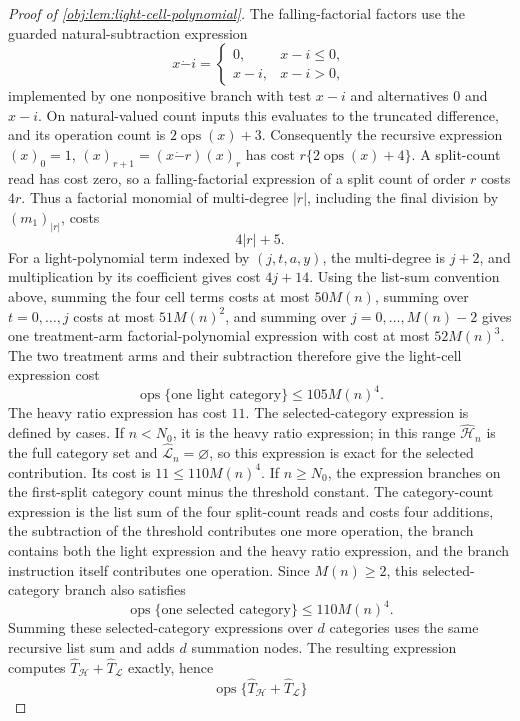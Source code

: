 \begin{proof}[Proof of \cref{obj:lem:light-cell-polynomial}]
The falling-factorial factors use the guarded natural-subtraction expression
\[
x\mathbin{\dot{-}} i
=
\begin{cases}
0,&x-i\le0,\\
x-i,&x-i>0,
\end{cases}
\]
implemented by one nonpositive branch with test \(x-i\) and alternatives \(0\) and \(x-i\).  On natural-valued count inputs this evaluates to the truncated difference, and its operation count is \(2\operatorname{ops}(x)+3\).  Consequently the recursive expression
\((x)_0=1\), \((x)_{r+1}=(x\mathbin{\dot{-}} r)(x)_r\) has cost \(r\{2\operatorname{ops}(x)+4\}\).  A split-count read has cost zero, so a falling-factorial expression of a split count of order \(r\) costs \(4r\).  Thus a factorial monomial of multi-degree \(|r|\), including the final division by \((m_1)_{|r|}\), costs
\[
4|r|+5 .
\]
For a light-polynomial term indexed by \((j,t,a,y)\), the multi-degree is \(j+2\), and multiplication by its coefficient gives cost \(4j+14\).  Using the list-sum convention above, summing the four cell terms costs at most \(50M(n)\), summing over \(t=0,\ldots,j\) costs at most \(51M(n)^2\), and summing over \(j=0,\ldots,M(n)-2\) gives one treatment-arm factorial-polynomial expression with cost at most \(52M(n)^3\).  The two treatment arms and their subtraction therefore give the light-cell expression cost
\[
\operatorname{ops}\{\text{one light category}\}
\le 105M(n)^4 .
\]
The heavy ratio expression has cost \(11\).  The selected-category expression is defined by cases.  If \(n<N_0\), it is the heavy ratio expression; in this range \(\widehat{\mathcal H}_n\) is the full category set and \(\widehat{\mathcal L}_n=\varnothing\), so this expression is exact for the selected contribution.  Its cost is \(11\le110M(n)^4\).  If \(n\ge N_0\), the expression branches on the first-split category count minus the threshold constant.  The category-count expression is the list sum of the four split-count reads and costs four additions, the subtraction of the threshold contributes one more operation, the branch contains both the light expression and the heavy ratio expression, and the branch instruction itself contributes one operation.  Since \(M(n)\ge2\), this selected-category branch also satisfies
\[
\operatorname{ops}\{\text{one selected category}\}
\le 110M(n)^4 .
\]
Summing these selected-category expressions over \(d\) categories uses the same recursive list sum and adds \(d\) summation nodes.  The resulting expression computes \(\widehat T_{\mathcal H}+\widehat T_{\mathcal L}\) exactly, hence
\[
\operatorname{ops}\{\widehat T_{\mathcal H}+\widehat T_{\mathcal L}\}
\]
\end{proof}
